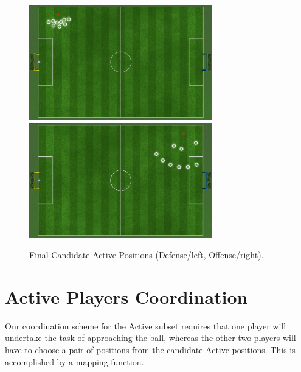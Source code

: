 \begin{figure}[t!]
\centering
  \includegraphics[height=5cm, clip, trim=0cm 10cm 20cm 0cm]{Chapter4/figures/ActiveAfter(-8,6).png} \	
  \includegraphics[height=5cm, clip, trim=20cm 10cm 0cm 0cm]{Chapter4/figures/ActiveAfter(8,6).png}
  \caption{Final Candidate Active Positions (Defense/left, Offense/right).} 
  \label{fig:ActivePositions3}
\end{figure}


\section{Active Players Coordination}
\label{sec:ActiveCoordination}
Our coordination scheme for the Active subset requires that one player will undertake the task of approaching the ball, whereas the other two players will have to choose a pair of positions from the candidate Active positions.  This is accomplished by a mapping function.  

